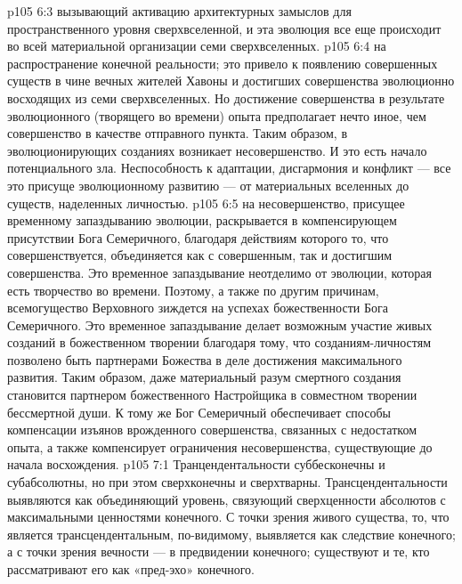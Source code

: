 \vs p105 6:3 \pc {}\bibnobreakspace {} вызывающий активацию архитектурных замыслов для пространственного уровня сверхвселенной, и эта эволюция все еще происходит во всей материальной организации семи сверхвселенных.
\vs p105 6:4 \pc {}\bibnobreakspace {} на распространение конечной реальности; это привело к появлению совершенных существ в чине вечных жителей Хавоны и достигших совершенства эволюционно восходящих из семи сверхвселенных. Но достижение совершенства в результате эволюционного (творящего во времени) опыта предполагает нечто иное, чем совершенство в качестве отправного пункта. Таким образом, в эволюционирующих созданиях возникает несовершенство. И это есть начало потенциального зла. Неспособность к адаптации, дисгармония и конфликт --- все это присуще эволюционному развитию --- от материальных вселенных до существ, наделенных личностью.
\vs p105 6:5 \pc {}\bibnobreakspace {} на несовершенство, присущее временному запаздыванию эволюции, раскрывается в компенсирующем присутствии Бога Семеричного, благодаря действиям которого то, что совершенствуется, объединяется как с совершенным, так и достигшим совершенства. Это временное запаздывание неотделимо от эволюции, которая есть творчество во времени. Поэтому, а также по другим причинам, всемогущество Верховного зиждется на успехах божественности Бога Семеричного. Это временное запаздывание делает возможным участие живых созданий в божественном творении благодаря тому, что созданиям\hyp{}личностям позволено быть партнерами Божества в деле достижения максимального развития. Таким образом, даже материальный разум смертного создания становится партнером божественного Настройщика в совместном творении бессмертной души. К тому же Бог Семеричный обеспечивает способы компенсации изъянов врожденного совершенства, связанных с недостатком опыта, а также компенсирует ограничения несовершенства, существующие до начала восхождения.
\vs p105 7:1 Транцендентальности суббесконечны и субабсолютны, но при этом сверхконечны и сверхтварны. Трансцендентальности выявляются как объединяющий уровень, связующий сверхценности абсолютов с максимальными ценностями конечного. С точки зрения живого существа, то, что является трансцендентальным, по\hyp{}видимому, выявляется как следствие конечного; а с точки зрения вечности --- в предвидении конечного; существуют и те, кто рассматривают его как «пред\hyp{}эхо» конечного.
